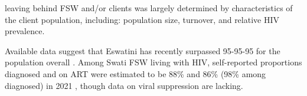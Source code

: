 leaving behind FSW and/or clients was largely determined by
characteristics of the client population, including:
population size, turnover, and relative HIV prevalence.
\par
Available data suggest that
Eswatini has recently surpassed 95-95-95 for the population overall \cite{SHIMS3}.
Among Swati FSW living with HIV, self-reported proportions diagnosed and on ART
were estimated to be 88\% and 86\% (98\% among diagnosed) in 2021 \cite{EswIBBS2022},
though data on viral suppression are lacking.
